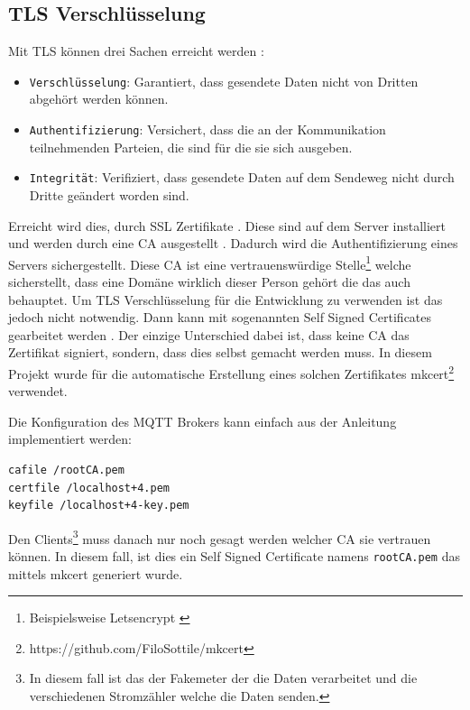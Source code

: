 \subsection{\ac{TLS} Verschlüsselung}

Mit \ac{TLS} können drei Sachen erreicht werden \parencite{what_is_tls}:

\begin{itemize}
    \item \texttt{Verschlüsselung}: Garantiert, dass gesendete Daten nicht von Dritten abgehört werden können.
    \item \texttt{Authentifizierung}: Versichert, dass die an der Kommunikation teilnehmenden Parteien, die sind für die sie sich ausgeben.
    \item \texttt{Integrität}: Verifiziert, dass gesendete Daten auf dem Sendeweg nicht durch Dritte geändert worden sind.
\end{itemize}

Erreicht wird dies, durch SSL Zertifikate \parencite{what_is_ssl_certificate}. Diese sind auf dem Server
installiert und werden durch eine \ac{CA} ausgestellt \parencite{what_is_ca}.
Dadurch wird die Authentifizierung eines Servers sichergestellt.
Diese \ac{CA} ist eine vertrauenswürdige Stelle\footnote{
    Beispielsweise Letsencrypt \parencite{letsencrypt_2021}
} welche sicherstellt, dass eine Domäne wirklich dieser Person gehört die das auch behauptet.
Um \ac{TLS} Verschlüsselung für die Entwicklung zu verwenden ist das jedoch nicht notwendig.
Dann kann mit sogenannten Self Signed Certificates gearbeitet werden \parencite{self_signed_cert}.
Der einzige Unterschied dabei ist, dass keine \ac{CA} das Zertifikat signiert, sondern, dass
dies selbst gemacht werden muss. In diesem Projekt wurde für die automatische Erstellung eines solchen
Zertifikates mkcert\footnote{https://github.com/FiloSottile/mkcert} verwendet.

Die Konfiguration des \ac{MQTT} Brokers kann einfach aus der Anleitung \parencite{mosquitto.conf_man_page_2021}
implementiert werden:

\begin{verbatim}
cafile /rootCA.pem
certfile /localhost+4.pem
keyfile /localhost+4-key.pem
\end{verbatim}

Den Clients\footnote{
    In diesem fall ist das der Fakemeter der die Daten verarbeitet und die verschiedenen
    Stromzähler welche die Daten senden.
} muss danach nur noch gesagt werden welcher \ac{CA} sie vertrauen können.
In diesem fall, ist dies ein Self Signed Certificate namens \texttt{rootCA.pem} das mittels
mkcert generiert wurde.

